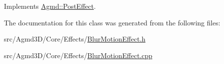 Implements \hyperlink{class_agmd_1_1_post_effect_a7fa3e1ad3a588dce0f9f51db8b420c91}{Agmd\+::\+Post\+Effect}.



The documentation for this class was generated from the following files\+:\begin{DoxyCompactItemize}
\item 
src/\+Agmd3\+D/\+Core/\+Effects/\hyperlink{_blur_motion_effect_8h}{Blur\+Motion\+Effect.\+h}\item 
src/\+Agmd3\+D/\+Core/\+Effects/\hyperlink{_blur_motion_effect_8cpp}{Blur\+Motion\+Effect.\+cpp}\end{DoxyCompactItemize}
